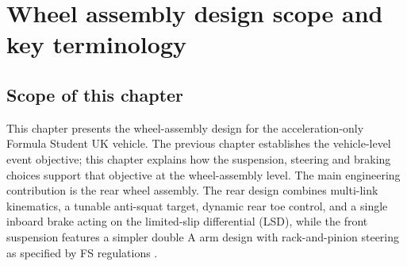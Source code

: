 \providecommand{\figbox}[2]{\begin{figure}[H]\centering\fbox{\parbox[c][#1][c]{0.92\linewidth}{\centering #2}}\caption{#2}\end{figure}}

\vspace{-25px}
\label{chap:wheel_assembly_design}

\section{Wheel assembly design scope and key terminology}

\subsection{Scope of this chapter}
This chapter presents the wheel-assembly design for the acceleration-only Formula Student UK vehicle. The previous chapter establishes the vehicle-level event objective; this chapter explains how the suspension, steering and braking choices support that objective at the wheel-assembly level. The main engineering contribution is the rear wheel assembly. The rear design combines multi-link kinematics, a tunable anti-squat target, dynamic rear toe control, and a single inboard brake acting on the limited-slip differential (LSD), while the front suspension features a simpler double A arm design with rack-and-pinion steering as specified by FS regulations \parencite{fs-ev-rules2026}.

